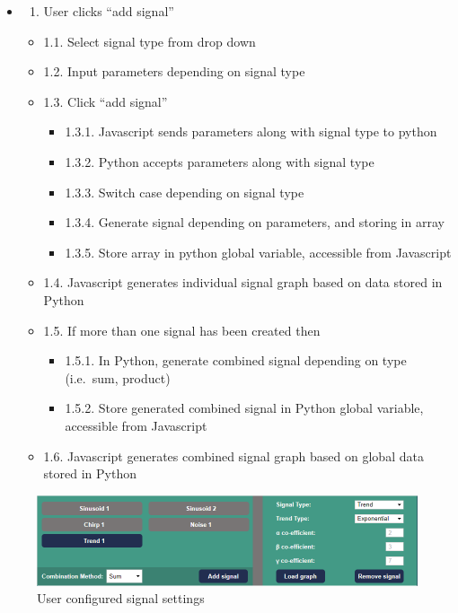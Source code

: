\documentclass[
  paper=a4,
  ,captions=tableheading
]{scrartcl}
\providecommand{\tightlist}{%
  \setlength{\itemsep}{0pt}\setlength{\parskip}{0pt}}
\begin{document}
\begin{itemize}
\item
  \begin{enumerate}
  \def\labelenumi{\arabic{enumi}.}
  \tightlist
  \item
    User clicks ``add signal''
  \end{enumerate}

  \begin{itemize}
  \tightlist
  \item
    1.1. Select signal type from drop down
  \item
    1.2. Input parameters depending on signal type
  \item
    1.3. Click ``add signal''

    \begin{itemize}
    \tightlist
    \item
      1.3.1. Javascript sends parameters along with signal type to
      python
    \item
      1.3.2. Python accepts parameters along with signal type
    \item
      1.3.3. Switch case depending on signal type
    \item
      1.3.4. Generate signal depending on parameters, and storing in
      array
    \item
      1.3.5. Store array in python global variable, accessible from
      Javascript
    \end{itemize}
  \item
    1.4. Javascript generates individual signal graph based on data
    stored in Python
  \item
    1.5. If more than one signal has been created then

    \begin{itemize}
    \tightlist
    \item
      1.5.1. In Python, generate combined signal depending on type
      (i.e.~sum, product)
    \item
      1.5.2. Store generated combined signal in Python global variable,
      accessible from Javascript
    \end{itemize}
  \item
    1.6. Javascript generates combined signal graph based on global data
    stored in Python
  \end{itemize}
\end{itemize}

\begin{figure}
\centering
\includegraphics{img/configure_settings.PNG}
\caption{User configured signal settings}
\end{figure}
\end{document}
